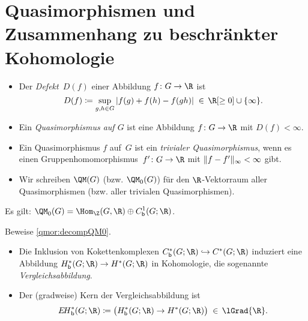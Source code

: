 \section{Quasimorphismen und Zusammenhang zu beschränkter Kohomologie}
\begin{thDef} \hfill
    \begin{itemize}
        \item
            Der \emph{Defekt~$D(f)$} einer Abbildung $f\colon G\to\R$
            ist
            \[ D(f) \defeq \sup_{g,h\in G}\, \abs{f(g) + f(h) - f(gh)}
                \;\in\, \R[\geq0] \cup \{\infty\}
            . \]
            
        \item
            Ein \emph{Quasimorphismus auf $G$} ist eine
            Abbildung $f\colon G\to\R$ mit $D(f) < \infty$.
            
        \item
            Ein Quasimorphismus $f$ auf~$G$ ist ein
            \emph{trivialer Quasimorphismus}, wenn es einen
            Gruppenhomomorphismus~$f'\colon G\to\R$ mit
            $\lVert f-f'\rVert_\infty < \infty$ gibt.
            
        \item
            Wir schreiben $\QM(G)$ (bzw. $\QM_0(G)$) für den $\R$-Vektorraum
            aller Quasimorphismen (bzw. aller trivialen Quasimorphismen). 
    \end{itemize}
\end{thDef}

\begin{thProposition}
    \label{qmor:decompQM0}%
    Es gilt: $\displaystyle\QM_0(G) = \Hom_\Z(G,\R) \oplus \Cb^1(G;\R)$.
\end{thProposition}

\begin{thAufgabe}
    Beweise \cref{qmor:decompQM0}.
\end{thAufgabe}

\begin{thErinnerDef} \hfill
    \begin{itemize}
        \item
            Die Inklusion von Kokettenkomplexen $\Cb^\ast(G;\R) \hookrightarrow
            C^\ast(G;\R)$ induziert eine Abbildung $\Hb^\ast(G;\R) \to
            H^\ast(G;\R)$ in Kohomologie, die sogenannte
            \emph{Vergleichsabbildung}.
        \item
            Der (gradweise) Kern der Vergleichsabbildung ist
            \[ \EHb^\ast(G;\R)
                \defeq \ker\bigl( \Hb^\ast(G;\R) \to H^\ast(G;\R) \bigr)
                \;\in\, \lGrad{\R}
            . \]
    \end{itemize}
\end{thErinnerDef}


